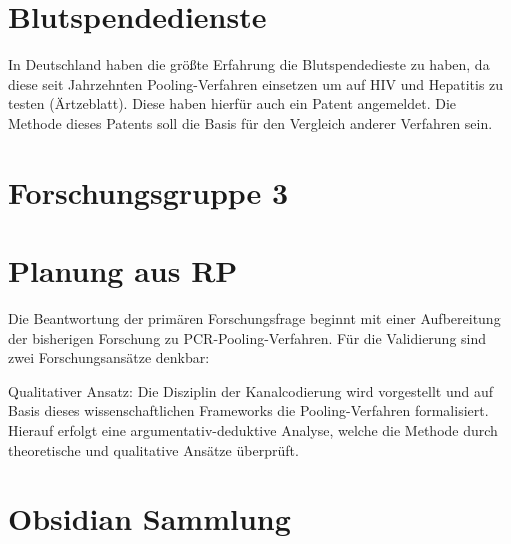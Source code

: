 \section{Blutspendedienste}
In Deutschland haben die größte Erfahrung die Blutspendedieste zu haben, da diese seit Jahrzehnten Pooling-Verfahren einsetzen um auf HIV und Hepatitis zu testen (Ärtzeblatt). Diese haben hierfür auch ein Patent angemeldet. Die Methode dieses Patents soll die Basis für den Vergleich anderer Verfahren sein.

\section{Forschungsgruppe 3}



\section{Planung aus RP}
Die Beantwortung der primären Forschungsfrage beginnt mit einer Aufbereitung der bisherigen Forschung zu PCR-Pooling-Verfahren.
Für die Validierung sind zwei Forschungsansätze denkbar:

Qualitativer Ansatz:
Die Disziplin der Kanalcodierung wird vorgestellt und auf Basis dieses wissenschaftlichen Frameworks die Pooling-Verfahren formalisiert.
Hierauf erfolgt eine argumentativ-deduktive Analyse, welche die Methode durch theoretische und qualitative Ansätze überprüft.


\section{Obsidian Sammlung}
